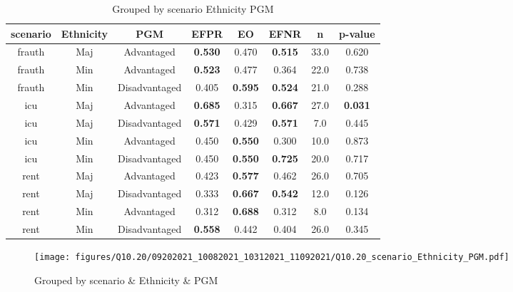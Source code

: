 \begin{table}[h]
    \centering
    \begin{tabular}{|c|c|c|c|c|c|c|c|}
        \hline
        scenario & Ethnicity & PGM & EFPR & EO & EFNR & n & p-value\\
        \hline
        frauth & Maj & Advantaged & \textbf{0.530} & 0.470 & \textbf{0.515} & 33.0 & 0.620\\
		frauth & Min & Advantaged & \textbf{0.523} & 0.477 & 0.364 & 22.0 & 0.738\\
		frauth & Min & Disadvantaged & 0.405 & \textbf{0.595} & \textbf{0.524} & 21.0 & 0.288\\
		icu & Maj & Advantaged & \textbf{0.685} & 0.315 & \textbf{0.667} & 27.0 & \textbf{0.031}\\
		icu & Maj & Disadvantaged & \textbf{0.571} & 0.429 & \textbf{0.571} & 7.0 & 0.445\\
		icu & Min & Advantaged & 0.450 & \textbf{0.550} & 0.300 & 10.0 & 0.873\\
		icu & Min & Disadvantaged & 0.450 & \textbf{0.550} & \textbf{0.725} & 20.0 & 0.717\\
		rent & Maj & Advantaged & 0.423 & \textbf{0.577} & 0.462 & 26.0 & 0.705\\
		rent & Maj & Disadvantaged & 0.333 & \textbf{0.667} & \textbf{0.542} & 12.0 & 0.126\\
		rent & Min & Advantaged & 0.312 & \textbf{0.688} & 0.312 & 8.0 & 0.134\\
		rent & Min & Disadvantaged & \textbf{0.558} & 0.442 & 0.404 & 26.0 & 0.345\\
		
        \hline
    \end{tabular}
    \caption{Grouped by scenario Ethnicity PGM}
    \label{tab:my_label}
\end{table}
\begin{figure}[h]
    \centering
    \texttt{[image: figures/Q10.20/09202021\_10082021\_10312021\_11092021/Q10.20\_scenario\_Ethnicity\_PGM.pdf]}
    \caption{Grouped by scenario \& Ethnicity \& PGM}
    \label{fig:my_label}
\end{figure}
